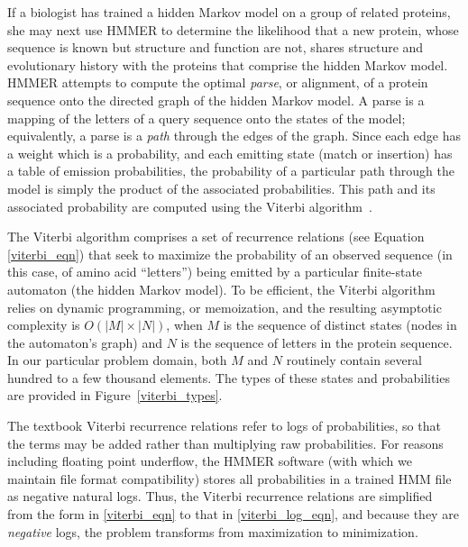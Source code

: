 \documentclass[preprint,nocopyrightspace,times]{sigplanconf}
\begin{document}
If a biologist has trained a hidden Markov model on a group of related 
proteins, she may next use HMMER to determine the likelihood that a new 
protein, whose sequence is known but structure and function are not, shares 
structure and evolutionary history with the proteins that comprise the hidden 
Markov model. HMMER attempts to compute the optimal \textit{parse}, or 
alignment, of a protein sequence onto the directed graph of the hidden Markov 
model. A parse is a mapping of the letters of a query sequence onto the states 
of the model; equivalently, a parse is a \textit{path} through the edges of the 
graph. Since each edge has a weight which is a probability, and each emitting 
state (match or insertion) has a table of emission probabilities, the 
probability of a particular path through the model is simply the product of the 
associated probabilities. This path and its associated probability are computed 
using the Viterbi algorithm~\cite{Viterbi:1967}.


The Viterbi algorithm comprises a set of recurrence 
relations (see Equation \ref{viterbi_eqn}) that seek to maximize the 
probability of an observed sequence (in this case, of amino acid ``letters'') 
being emitted by a particular finite-state automaton (the hidden Markov model). 
To be efficient, the Viterbi 
algorithm relies on dynamic programming, or memoization, and the resulting 
asymptotic complexity is $O(|M|\times|N|)$, when $M$ is the sequence of 
distinct states (nodes in the automaton's graph) and $N$ is the sequence of 
letters in the protein sequence. In our particular problem domain, both $M$ and 
$N$ routinely contain several hundred to a few thousand elements. The types of 
these states and probabilities are provided in Figure~\ref{viterbi_types}.


\begin{figure}

\end{figure}


The textbook Viterbi recurrence relations refer to logs of probabilities, so 
that the terms may be added rather than multiplying raw probabilities. For 
reasons including floating point underflow, the HMMER software (with which we 
maintain file format compatibility) stores all probabilities in a trained HMM 
file as negative natural logs. Thus, the Viterbi recurrence relations are 
simplified from the form in \ref{viterbi_eqn} to that in \ref{viterbi_log_eqn}, 
and because they are \textit{negative} logs, the problem transforms from 
maximization to minimization.
\end{document}
